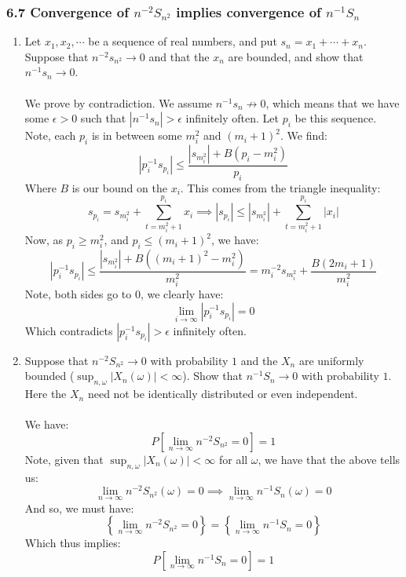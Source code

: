 \documentclass[12pt,a4paper]{article}
\newcommand{\1}[1]{\mathbbm{1}\left\{ #1 \right\}}
\begin{document}
\subsubsection{6.7 Convergence of $n^{-2}S_{n^2}$ implies convergence of $n^{-1}S_n$}
\begin{enumerate}
	\item Let $x_1, x_2, \cdots$ be a sequence of real numbers, and put $s_n = x_1 + \cdots + x_n$. Suppose that $n^{-2}s_{n^2} \to 0$ and that the $x_n$ are bounded, and show that $n^{-1}s_n \to 0$.
	\\\\
	We prove by contradiction. We assume $n^{-1}s_n \not\to 0$, which means that we have some $\epsilon > 0$ such that $|n^{-1}s_n| > \epsilon$ infinitely often. Let $p_i$ be this sequence. Note, each $p_i$ is in between some $m_i^2$ and $(m_i+1)^2$. We find:
	$$
		|p_i^{-1}s_{p_i}| \leq \frac{|s_{m_i^2}| + B(p_i - m_i^2)}{p_i}
	$$
	Where $B$ is our bound on the $x_i$. This comes from the triangle inequality:
	$$
		s_{p_i} = s_{m_i^2} + \sum_{t = m_i^2 + 1}^{p_i} x_i \implies
		|s_{p_i}| \leq |s_{m_i^2}| + \sum_{t = m_i^2 + 1}^{p_i} |x_i|
	$$
	Now, as $p_i \geq m_i^2$, and $p_i \leq (m_i + 1)^2$, we have:
	$$
		|p_i^{-1}s_{p_i}| \leq \frac{|s_{m_i^2}| + B((m_i + 1)^2 - m_i^2)}{m_i^2} =
		m_i^{-2}s_{m_i^2} + \frac{B(2m_i + 1)}{m_i^2}
	$$
	Note, both sides go to $0$, we clearly have:
	$$
		\lim_{i \to \infty} |p_i^{-1}s_{p_i}| = 0
	$$
	Which contradicts $|p_i^{-1}s_{p_i}| > \epsilon$ infinitely often.
	
	\item Suppose that $n^{-2}S_{n^2} \to 0$ with probability $1$ and the $X_n$ are uniformly bounded ($\sup_{n,\omega} |X_n(\omega)| < \infty$). Show that $n^{-1}S_n \to 0$ with probability $1$. Here the $X_n$ need not be identically distributed or even independent.
	\\\\
	We have:
	$$
		P\left[\lim_{n \to \infty} n^{-2}S_{n^2} = 0\right] = 1
	$$
	Note, given that $\sup_{n,\omega} |X_n(\omega)| < \infty$ for all $\omega$, we have that the above tells us:
	$$
		\lim_{n \to \infty} n^{-2}S_{n^2}(\omega) = 0 \implies
		\lim_{n \to \infty} n^{-1}S_n(\omega) = 0
	$$
	And so, we must have:
	$$
		\left\{\lim_{n \to \infty} n^{-2}S_{n^2} = 0\right\} = \left\{\lim_{n \to \infty} n^{-1}S_n = 0\right\}
	$$
	Which thus implies:
	$$
		P\left[\lim_{n \to \infty} n^{-1}S_n = 0\right] = 1
	$$	
\end{enumerate}
\end{document}
